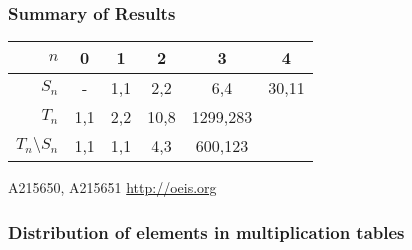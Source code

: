 \documentclass{beamer}
\newcommand{\cT}{{\cal T}}
\begin{document}

\begin{frame}\frametitle{Summary of Results}
\begin{center}

\begin{tabular}{|r|c|c|c|c|c|}
\hline
$n$ & 0 & 1 & 2 & 3 & 4 \\
\hline
$S_n$ & - & 1,1 & 2,2 & 6,4 & 30,11\\
\hline
$T_n$ &1,1 & 2,2 & 10,8 & 1299,283 & \\
\hline
$T_n\setminus S_n$ & 1,1 & 1,1 & 4,3 & 600,123& \\
\hline
\end{tabular}
\end{center}
A215650, A215651 \url{http://oeis.org}
\end{frame}

\begin{frame}
\frametitle{Distribution of elements in multiplication tables}
\end{frame}
\end{document}
